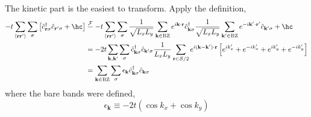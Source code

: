The kinetic part is the easiest to transform. Apply the definition,
\begin{align}
	-t \sum_{\langle \mathbf{r}\mathbf{r}' \rangle} \sum_\sigma \left[
		\hat c_{\mathbf{r}\sigma}^\dagger \hat c_{\mathbf{r}'\sigma} + \hc
	\right] &\stackrel{\mathcal{F}}{=} -t \sum_{\langle \mathbf{r}\mathbf{r}' \rangle} \sum_\sigma \frac{1}{\sqrt{L_xL_y}} \sum_{\mathbf{k}\in\mathrm{BZ}} e^{i\mathbf{k}\cdot\mathbf{r}} \hat c_{\mathbf{k}\sigma}^\dagger \frac{1}{\sqrt{L_xL_y}} \sum_{\mathbf{k}'\in\mathrm{BZ}} e^{-i\mathbf{k}'\cdot\mathbf{r}'} \hat c_{\mathbf{k}'\sigma} + \hc \nonumber \\
	&= -2t\sum_{\mathbf{k},\mathbf{k}'} \sum_\sigma \hat c_{\mathbf{k}\sigma}^\dagger \hat c_{\mathbf{k}'\sigma} \frac{1}{L_x L_y} \sum_{\mathbf{r}\in\mathcal{S}/2} e^{i(\mathbf{k}-\mathbf{k}')\cdot\mathbf{r}} \left[
		e^{i k'_x}+e^{-i k'_x} + e^{i k'_y}+e^{-i k'_y}
	\right] \nonumber \\
	&= \sum_{\mathbf{k} \in \mathrm{BZ}} \sum_\sigma \epsilon_\mathbf{k} \hat c_{\mathbf{k}\sigma}^\dagger \hat c_{\mathbf{k}\sigma} \label{eq:Ht-Fourier}
\end{align}
where the bare bands were defined, 
\begin{equation}\label{eq:bare-bands}
	\epsilon_\mathbf{k} \equiv -2t \left(
		\cos k_x + \cos k_y
	\right)
\end{equation}

